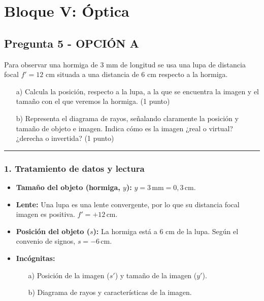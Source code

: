 \section{Bloque V: Óptica}
\label{sec:optica_2019_jul_ext}

\subsection{Pregunta 5 - OPCIÓN A}
\label{subsec:5A_2019_jul_ext}

\begin{cajaenunciado}
Para observar una hormiga de 3 mm de longitud se usa una lupa de distancia focal $f'=12$ cm situada a una distancia de 6 cm respecto a la hormiga.
\begin{enumerate}
    \item[a)] Calcula la posición, respecto a la lupa, a la que se encuentra la imagen y el tamaño con el que veremos la hormiga. (1 punto)
    \item[b)] Representa el diagrama de rayos, señalando claramente la posición y tamaño de objeto e imagen. Indica cómo es la imagen ¿real o virtual? ¿derecha o invertida? (1 punto)
\end{enumerate}
\end{cajaenunciado}
\hrule

\subsubsection*{1. Tratamiento de datos y lectura}
\begin{itemize}
    \item \textbf{Tamaño del objeto (hormiga, $y$):} $y=3\,\text{mm} = 0,3\,\text{cm}$.
    \item \textbf{Lente:} Una lupa es una lente convergente, por lo que su distancia focal imagen es positiva. $f' = +12\,\text{cm}$.
    \item \textbf{Posición del objeto ($s$):} La hormiga está a 6 cm de la lupa. Según el convenio de signos, $s = -6\,\text{cm}$.
    \item \textbf{Incógnitas:}
    \begin{itemize}
        \item[a)] Posición de la imagen ($s'$) y tamaño de la imagen ($y'$).
        \item[b)] Diagrama de rayos y características de la imagen.
    \end{itemize}
\end{itemize}

